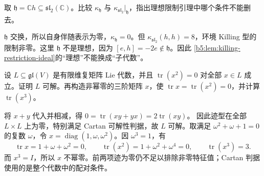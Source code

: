 \begin{exercise}\label{b5:ex:13-subalgebra-killing}
	取 \(\mathfrak h=\mathbb Ch\subseteq\mathfrak{sl}_2(\mathbb C)\)。比较 \(\kappa_{\mathfrak h}\) 与 \(\kappa_{\mathfrak{sl}_2}|_{\mathfrak h}\)，指出理想限制引理中哪个条件不能删去。
\end{exercise}
\begin{solution}
	\(\mathfrak h\) 交换，所以自身伴随表示为零，\(\kappa_{\mathfrak h}=0\)。但 \(\kappa_{\mathfrak{sl}_2}(h,h)=8\)，环境 Killing 型的限制非零。这里 \(\mathfrak h\) 不是理想，因为 \([e,h]=-2e\notin\mathfrak h\)。因此 \cref{b5:lem:killing-restriction-ideal}的“理想”不能换成“子代数”。
\end{solution}

\begin{exercise}\label{b5:ex:13-polarized-trace}
	设 \(L\subseteq\mathfrak{gl}(V)\) 是有限维复矩阵 Lie 代数，并且 \(\operatorname{tr}(x^2)=0\) 对全部 \(x\in L\) 成立。证明 \(L\) 可解。再构造非幂零的三阶矩阵 \(x\)，使 \(\operatorname{tr}x=\operatorname{tr}(x^2)=0\)，并计算 \(\operatorname{tr}(x^3)\)。
\end{exercise}
\begin{solution}
	将 \(x+y\) 代入并相减，得 \(0=\operatorname{tr}(xy+yx)=2\operatorname{tr}(xy)\)。 因此迹型在全部 \(L\times L\) 上为零，特别满足 Cartan 可解性判据，故 \(L\) 可解。取满足 \(\omega^2+\omega+1=0\) 的复数 \(\omega\)，令 \(x=\operatorname{diag}(1,\omega,\omega^2)\)。因 \(\omega^3=1\)，有
	\[
		\operatorname{tr}x=1+\omega+\omega^2=0,\qquad \operatorname{tr}(x^2)=1+\omega^2+\omega^4=0,\qquad \operatorname{tr}(x^3)=3.
	\]
	而 \(x^3=I\)，所以 \(x\) 不幂零。前两项迹为零仍不足以排除非零特征值；Cartan 判据使用的是整个代数中的配对条件。
\end{solution}

